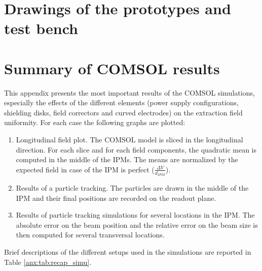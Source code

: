 \chapter{Drawings of the prototypes and test bench}








\chapter{Summary of COMSOL results}
\label{anx:COMSOL}
This appendix presents the most important results of the COMSOL simulations, especially the effects of the different elements (power supply configurations, shielding disks, field correctors and curved electrodes) on the extraction field uniformity.
For each case the following graphs are plotted:
\begin{enumerate}
  \item Longitudinal field plot. The COMSOL model is sliced in the longitudinal direction. For each slice and for each field components, the quadratic mean is computed in the middle of the IPMs. The means are normalized by the expected field in case of the IPM is perfect ($\frac{\Delta V}{d_{IPM}}$).
  \item Results of a particle tracking. The particles are drawn in the middle of the IPM and their final positions are recorded on the readout plane.
  \item Results of particle tracking simulations for several locations in the IPM. The absolute error on the beam position and the relative error on the beam size is then computed for several transversal locations.
\end{enumerate}

Brief descriptions of the different setups used in the simulations are reported in Table \ref{anx:tab:recap_simu}.





